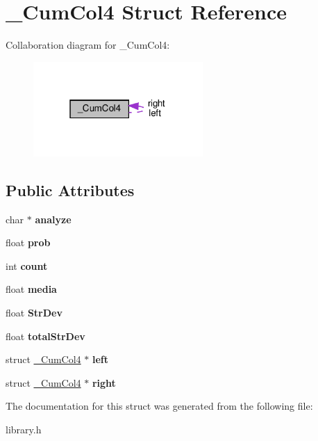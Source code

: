 \hypertarget{struct__CumCol4}{}\section{\+\_\+\+Cum\+Col4 Struct Reference}
\label{struct__CumCol4}


Collaboration diagram for \+\_\+\+Cum\+Col4\+:
\nopagebreak
\begin{figure}[H]
\begin{center}
\leavevmode
\includegraphics[width=183pt]{struct__CumCol4__coll__graph}
\end{center}
\end{figure}
\subsection*{Public Attributes}
\begin{DoxyCompactItemize}
\item 
\mbox{\label{struct__CumCol4_a0836e5d720571263a910ade8b0b61b22}} 
char $\ast$ {\bfseries analyze}
\item 
\mbox{\label{struct__CumCol4_a9ad9ad1d2806348025be19e97bc189d3}} 
float {\bfseries prob}
\item 
\mbox{\label{struct__CumCol4_a739585d1fabbaaf1104d096de42c074d}} 
int {\bfseries count}
\item 
\mbox{\label{struct__CumCol4_af7b17f86fb4f71c18465e3fdbf8c82de}} 
float {\bfseries media}
\item 
\mbox{\label{struct__CumCol4_a2a45de85bb6919d763919435b0928106}} 
float {\bfseries Str\+Dev}
\item 
\mbox{\label{struct__CumCol4_a41814f047c2f8082bd835a0c92ca6964}} 
float {\bfseries total\+Str\+Dev}
\item 
\mbox{\label{struct__CumCol4_ac689ab32b082fde43c793ea80325683b}} 
struct \hyperlink{struct__CumCol4}{\+\_\+\+Cum\+Col4} $\ast$ {\bfseries left}
\item 
\mbox{\label{struct__CumCol4_ae534286d0dbaf7676165270584071f38}} 
struct \hyperlink{struct__CumCol4}{\+\_\+\+Cum\+Col4} $\ast$ {\bfseries right}
\end{DoxyCompactItemize}


The documentation for this struct was generated from the following file\+:\begin{DoxyCompactItemize}
\item 
library.\+h\end{DoxyCompactItemize}
